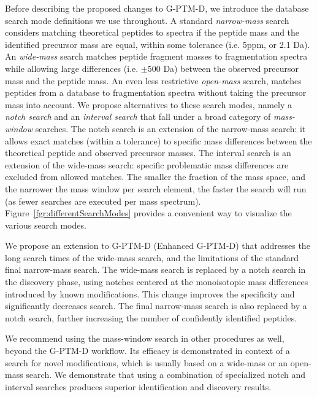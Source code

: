 \documentclass[journal=jprobs,manuscript=article]{achemso}
\begin{document}
Before describing the proposed changes to G-PTM-D, we introduce the database search mode definitions we use throughout. A standard \textit{narrow-mass} search considers matching theoretical peptides to spectra if the peptide mass and the identified precursor mass are equal, within some tolerance (i.e. 5ppm, or 2.1 Da). An \textit{wide-mass} search matches peptide fragment masses to fragmentation spectra while allowing large differences (i.e. $\pm 500$ Da) between the observed precursor mass and the peptide mass. An even less restrictive \textit{open-mass} search, matches peptides from a database to  fragmentation spectra without taking the precursor mass into account. We propose alternatives to these search modes, namely a \textit{notch search} and an \textit{interval search} that fall under a broad category of \textit{mass-window} searches. The notch search is an extension of the narrow-mass search: it allows exact matches (within a tolerance) to specific mass differences between the theoretical peptide and observed precursor masses. The interval search is an extension of the wide-mass search: specific problematic mass differences are excluded from allowed matches. The smaller the fraction of the mass space, and the narrower the mass window per search element, the faster the search will run (as fewer searches are executed per mass spectrum). Figure~\ref{fgr:differentSearchModes} provides a convenient way to visualize the various search modes.

We propose an extension to G-PTM-D (Enhanced G-PTM-D) that addresses the long search times of the wide-mass search, and the limitations of the standard final narrow-mass search. The wide-mass search is replaced by a notch search in the discovery phase, using notches centered at the monoisotopic mass differences introduced by known modifications. This change improves the specificity and significantly decreases search. The final narrow-mass search is also replaced by a notch search, further increasing the number of confidently identified peptides.

We recommend using the mass-window search in other procedures as well, beyond the G-PTM-D workflow. Its efficacy is demonstrated in context of a search for novel modifications, which is usually based on a wide-mass or an open-mass search. We demonstrate that using a combination of specialized notch and interval searches produces superior identification and discovery results.
\end{document}

